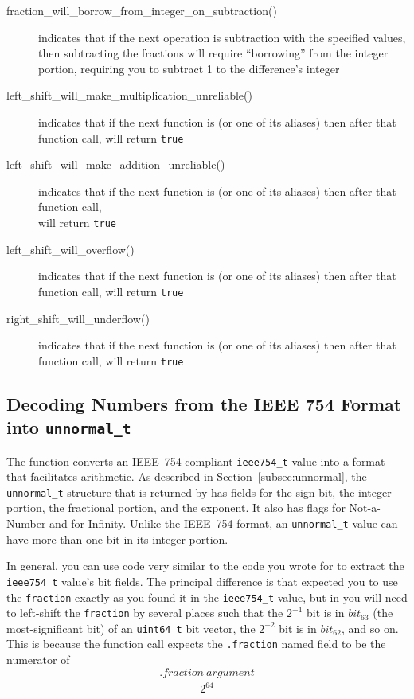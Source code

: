 \begin{itemize}
\begin{description}
        \item[fraction\_will\_borrow\_from\_integer\_on\_subtraction()] indicates that if the next operation is subtraction with the specified values, then subtracting the fractions will require ``borrowing'' from the integer portion, requiring you to subtract 1 to the difference's integer
        \item[left\_shift\_will\_make\_multiplication\_unreliable()] indicates that if the next function is  (or one of its aliases) then after that function call,  will return \lstinline{true}
        \item[left\_shift\_will\_make\_addition\_unreliable()] indicates that if the next function is  (or one of its aliases) then after that function call, \\  will return \lstinline{true}
        \item[left\_shift\_will\_overflow()] indicates that if the next function is  (or one of its aliases) then after that function call,  will return \lstinline{true}
        \item[right\_shift\_will\_underflow()] indicates that if the next function is  (or one of its aliases) then after that function call,  will return \lstinline{true}
    \end{description}
\end{itemize}

\subsection{Decoding Numbers from the IEEE 754 Format into \texttt{unnormal\_t}}

The  function converts an IEEE~754-compliant \lstinline{ieee754_t} value into a format that facilitates arithmetic.
As described in Section~\ref{subsec:unnormal}, the \lstinline{unnormal_t} structure that is returned by  has fields for the sign bit, the integer portion, the fractional portion, and the exponent.
It also has flags for Not-a-Number and for Infinity.
Unlike the IEEE~754 format, an \lstinline{unnormal_t} value can have more than one bit in its integer portion.

In general, you can use code very similar to the code you wrote for  to extract the \lstinline{ieee754_t} value's bit fields.
The principal difference is that  expected you to use the \lstinline{fraction} exactly as you found it in the \lstinline{ieee754_t} value,
but in  you will need to left-shift the \lstinline{fraction} by several places such that the $2^{-1}$ bit is in $bit_{63}$ (the most-significant bit) of an \lstinline{uint64_t} bit vector, the $2^{-2}$ bit is in $bit_{62}$, and so on.
This is because the  function call expects the \lstinline{.fraction} named field to be the numerator of
\[\frac{.fraction\ argument}{2^{64}}\]

